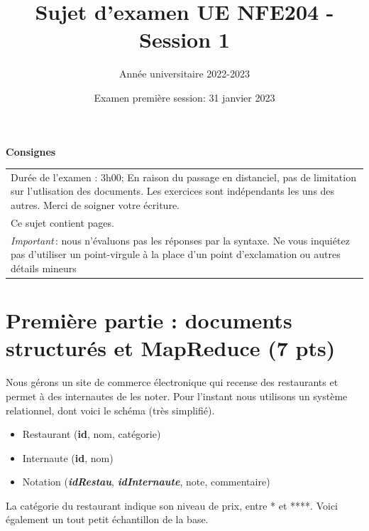 \documentclass[10pt,a4paper]{article}
\begin{document}
\title{Sujet d'examen UE NFE204 - Session 1}
\author{Année universitaire 2022-2023}
\date{Examen première session: 31 janvier 2023}

\maketitle

\begin{center}
{\bf \Large Consignes}\\
\begin{tabular}{| p{15cm} |}
\hline
Dur\'ee de l'examen : 3h00; En raison du passage en distanciel, pas de limitation sur l'utlisation
des documents. Les exercices sont indépendants les uns des autres. Merci de soigner votre écriture.\\
Ce sujet contient \pageref{LastPage} pages.\\

\textit{Important}\,: nous n'évaluons pas les réponses par la syntaxe. Ne vous
inquiétez pas d'utiliser un point-virgule à la place d'un point d'exclamation ou
autres détails mineurs
\\
\hline
\end{tabular}
\end{center}


\section*{Première partie : documents structurés et MapReduce (7 pts)}

Nous gérons un site de commerce électronique qui recense des restaurants
et permet à des internautes de les noter. Pour l'instant nous utilisons
un système relationnel, dont voici le schéma (très simplifié).

\begin{itemize}
  \item Restaurant   (\textbf{id}, nom, catégorie)
  \item Internaute (\textbf{id}, nom)
  \item Notation (\textbf{\textit{idRestau}}, \textbf{\textit{idInternaute}}, note, commentaire)
\end{itemize}

\vspace*{0.2cm}

La catégorie du restaurant indique son niveau de prix, entre * et ****. 
Voici également un tout petit échantillon de la base.
\end{document}
